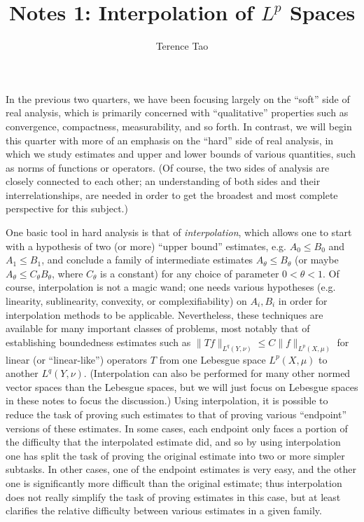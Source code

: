 \documentclass[10pt,reqno]{amsart}
\title{Notes 1: Interpolation of $L^p$ Spaces}
\author{Terence Tao}
\begin{document}
\maketitle

In the previous two quarters, we have been focusing largely on the “soft” side of real analysis, which is primarily concerned with “qualitative” properties such as convergence, compactness, measurability, and so forth. In contrast, we will begin this quarter with more of an emphasis on the “hard” side of real analysis, in which we study estimates and upper and lower bounds of various quantities, such as norms of functions or operators. (Of course, the two sides of analysis are closely connected to each other; an understanding of both sides and their interrelationships, are needed in order to get the broadest and most complete perspective for this subject.)

One basic tool in hard analysis is that of \emph{interpolation}, which allows one to start with a hypothesis of two (or more) “upper bound” estimates, e.g. $A_0 \leq B_0$ and $A_1 \leq B_1$, and conclude a family of intermediate estimates $A_\theta \leq B_\theta$ (or maybe $A_\theta \leq C_\theta B_\theta$, where $C_\theta$ is a constant) for any choice of parameter $0 < \theta < 1$. Of course, interpolation is not a magic wand; one needs various hypotheses (e.g. linearity, sublinearity, convexity, or complexifiability) on $A_i, B_i$ in order for interpolation methods to be applicable. Nevertheless, these techniques are available for many important classes of problems, most notably that of establishing boundedness estimates such as $\| T f \|_{L^q(Y, \nu)} \leq C \| f \|_{L^p(X, \mu)}$ for linear (or “linear-like”) operators $T$ from one Lebesgue space $L^p(X,\mu)$ to another $L^q(Y,\nu)$. (Interpolation can also be performed for many other normed vector spaces than the Lebesgue spaces, but we will just focus on Lebesgue spaces in these notes to focus the discussion.) Using interpolation, it is possible to reduce the task of proving such estimates to that of proving various “endpoint” versions of these estimates. In some cases, each endpoint only faces a portion of the difficulty that the interpolated estimate did, and so by using interpolation one has split the task of proving the original estimate into two or more simpler subtasks. In other cases, one of the endpoint estimates is very easy, and the other one is significantly more difficult than the original estimate; thus interpolation does not really simplify the task of proving estimates in this case, but at least clarifies the relative difficulty between various estimates in a given family.
\end{document}

